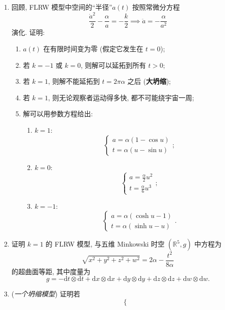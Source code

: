 \begin{RiemannExercise}
\begin{enumerate}[label=(\arabic*),ref=\arabic*,leftmargin=*]
\begin{enumerate}[label=(\alph*),leftmargin=*]
(\textbf{注}: 这意味着, 第一个星系以周期 $T$ 发出的光, 被第二个星系测得的周期为 $T'=\frac{a(t_1)}{a(t_0)}T$.)
\end{enumerate}
\item\label{ex:flrw-scale-factor-evolution}
回顾, FLRW 模型中空间的\textquotedblleft 半径\textquotedblright $a(t)$ 按照常微分方程
\[
  \frac{\dot a^2}{2}-\frac{\alpha}{a}=-\frac{k}{2}
  \implies\ddot a=-\frac{\alpha}{a^2}
\]
演化. 证明:
\begin{enumerate}[label=(\alph*),leftmargin=*]
\item $a(t)$ 在有限时间变为零 (假定它发生在 $t=0$);
\item 若 $k=-1$ 或 $k=0$, 则解可以延拓到所有 $t>0$;
\item 若 $k=1$, 则解不能延拓到 $t=2\pi\alpha$ 之后 (\label{idx:big-crunch}\textbf{大坍缩});
\item 若 $k=1$, 则无论观察者运动得多快, 都不可能绕宇宙一周;
\item 解可以用参数方程给出:
\begin{enumerate}[label=(\roman*),leftmargin=*]
\item $k=1$:
\[
  \begin{cases}
    a=\alpha(1-\cos u)\\
    t=\alpha(u-\sin u)
  \end{cases};
\]
\item $k=0$:
\[
  \begin{cases}
    a=\frac{\alpha}{2}u^2\\
    t=\frac{\alpha}{6}u^3
  \end{cases};
\]
\item $k=-1$:
\[
  \begin{cases}
    a=\alpha(\cosh u-1)\\
    t=\alpha(\sinh u-u)
  \end{cases}.
\]
\end{enumerate}
\end{enumerate}
\item\label{ex:closed-flrw-embedding-in-minkowski-spacetime}
证明 $k=1$ 的 FLRW 模型, 与五维 Minkowski 时空 $(\mathbb{R}^5,g)$ 中方程为
\[
  \sqrt{x^2+y^2+z^2+w^2}=2\alpha-\frac{t^2}{8\alpha}
\]
的超曲面等距, 其中度量为
\[
  g=-\mathrm{d}t\otimes\mathrm{d}t+\mathrm{d}x\otimes\mathrm{d}x
    +\mathrm{d}y\otimes\mathrm{d}y+\mathrm{d}z\otimes\mathrm{d}z+\mathrm{d}w\otimes\mathrm{d}w.
\]
\item\label{ex:flrw-model-for-gravitational-collapse}
(\emph{一个坍缩模型}) 证明若
\[
  \begin{cases}

\end{cases}\]
\end{enumerate}
\end{RiemannExercise}
